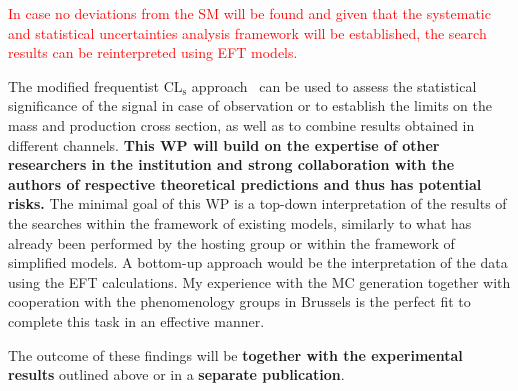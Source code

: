 \textcolor{red}{
In case no deviations from the SM will be found and given that the systematic and statistical uncertainties analysis framework will be established, the search results can be reinterpreted using EFT models.
}

The modified frequentist $\mathrm{CL_s}$ approach~\cite{Junk:1999kv,Read:2002hq} can be used to assess the statistical significance of the signal in case of observation or to establish the limits on the mass and production cross section, as well as to combine results obtained in different channels. \textbf{This WP will build on the expertise of other researchers in the institution and strong collaboration with the authors of respective theoretical predictions and thus has potential risks.} The minimal goal of this WP is a top-down interpretation of the results of the searches within the framework of existing models, similarly to what has already been performed by the hosting group or within the framework of simplified models. A bottom-up approach would be the interpretation of the data using the EFT calculations. My experience with the MC generation together with cooperation with the phenomenology groups in Brussels is the perfect fit to complete this task in an effective manner.

The outcome of these findings will be \textbf{together with the experimental results} outlined above or in a \textbf{separate publication}.
